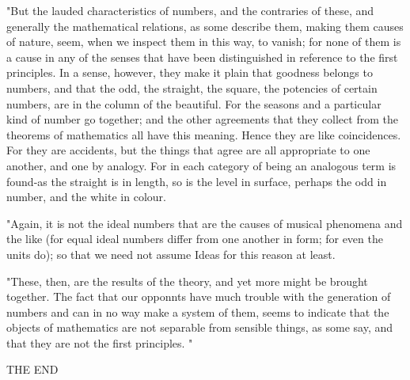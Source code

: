 "But the lauded characteristics of numbers, and the contraries of
these, and generally the mathematical relations, as some describe
them, making them causes of nature, seem, when we inspect them in
this way, to vanish; for none of them is a cause in any of the senses
that have been distinguished in reference to the first principles.
In a sense, however, they make it plain that goodness belongs to numbers,
and that the odd, the straight, the square, the potencies of certain
numbers, are in the column of the beautiful. For the seasons and a
particular kind of number go together; and the other agreements that
they collect from the theorems of mathematics all have this meaning.
Hence they are like coincidences. For they are accidents, but the
things that agree are all appropriate to one another, and one by analogy.
For in each category of being an analogous term is found-as the straight
is in length, so is the level in surface, perhaps the odd in number,
and the white in colour. 

"Again, it is not the ideal numbers that are the causes of musical
phenomena and the like (for equal ideal numbers differ from one another
in form; for even the units do); so that we need not assume Ideas
for this reason at least. 

"These, then, are the results of the theory, and yet more might be
brought together. The fact that our opponnts have much trouble with
the generation of numbers and can in no way make a system of them,
seems to indicate that the objects of mathematics are not separable
from sensible things, as some say, and that they are not the first
principles. "

THE END


